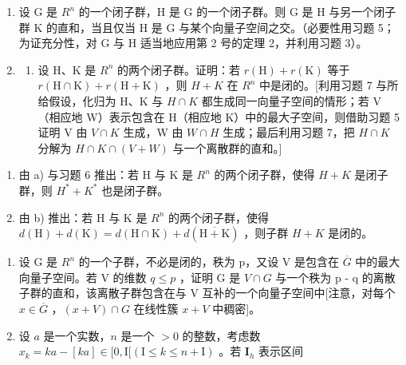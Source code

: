 \begin{enumerate}
\def\labelenumi{\arabic{enumi})}
\setcounter{enumi}{6}
\item
  设 G 是 \(R^{n}\) 的一个闭子群，H 是 G 的一个闭子群。则 G 是 H 与另一个闭子群 K 的直和，当且仅当 H 是 G 与某个向量子空间之交。（必要性用习题 5；为证充分性，对 G 与 H 适当地应用第 2 号的定理 2，并利用习题 3）。
\item
  \begin{enumerate}
  \def\labelenumii{\alph{enumii})}
  \tightlist
  \item
    设 H、K 是 \(R^{n}\) 的两个闭子群。证明：若 \(r(\mathrm{H}) + r(\mathrm{K})\) 等于 \(r(\mathrm{H} \cap \mathrm{K}) + r(\mathrm{H} + \mathrm{K})\) ，则 \(H + K\) 在 \(R^{n}\) 中是闭的。{[}利用习题 7 与所给假设，化归为 H、K 与 \(H \cap K\) 都生成同一向量子空间的情形；若 V（相应地 W）表示包含在 H（相应地 K）中的最大子空间，则借助习题 5 证明 V 由 \(V \cap K\) 生成，W 由 \(W \cap H\) 生成；最后利用习题 7，把 \(H \cap K\) 分解为 \(H \cap K \cap (V + W)\) 与一个离散群的直和。{]}
  \end{enumerate}
\end{enumerate}

\begin{enumerate}
\def\labelenumi{\alph{enumi})}
\setcounter{enumi}{1}
\item
  由 a) 与习题 6 推出：若 H 与 K 是 \(R^{n}\) 的两个闭子群，使得 \(H + K\) 是闭子群，则 \(H^{*} + K^{*}\) 也是闭子群。
\item
  由 b) 推出：若 H 与 K 是 \(R^{n}\) 的两个闭子群，使得 \(d(\mathrm{H}) + d(\mathrm{K}) = d(\mathrm{H} \cap \mathrm{K}) + d(\overline{\mathrm{H} + \mathrm{K}})\) ，则子群 \(H + K\) 是闭的。
\end{enumerate}

\begin{enumerate}
\def\labelenumi{\arabic{enumi})}
\setcounter{enumi}{8}
\item
  设 G 是 \(R^{n}\) 的一个子群，不必是闭的，秩为 p，又设 V 是包含在 \(\overline{G}\) 中的最大向量子空间。若 V 的维数 \(q \leqslant p\) ，证明 G 是 \(V \cap G\) 与一个秩为 p - q 的离散子群的直和，该离散子群包含在与 V 互补的一个向量子空间中{[}注意，对每个 \(x \in \overline{G}\) ，\((x + V) \cap G\) 在线性簇 \(x + V\) 中稠密{]}。
\item
  设 \(a\) 是一个实数，\(n\) 是一个 \(>0\) 的整数，考虑数 \(x_{k} = ka - [ka] \in [0, \mathrm{I}[(\mathrm{I} \leqslant k \leqslant n + \mathrm{I})\) 。若 \(\mathbf{I}_h\) 表示区间
\end{enumerate}

